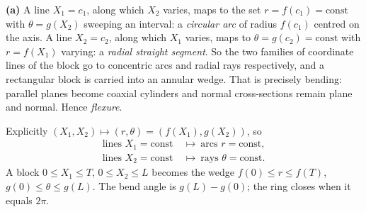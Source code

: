 \begin{solution}
\textbf{(a)} A line $X_{1}=c_{1}$, along which $X_{2}$ varies, maps to the
set $r=f(c_{1})=\text{const}$ with $\theta=g(X_{2})$ sweeping an interval:
a \emph{circular arc} of radius $f(c_{1})$ centred on the axis. A line
$X_{2}=c_{2}$, along which $X_{1}$ varies, maps to $\theta=g(c_{2})
=\text{const}$ with $r=f(X_{1})$ varying: a \emph{radial straight
segment}. So the two families of coordinate lines of the block go to
concentric arcs and radial rays respectively, and a rectangular block is
carried into an annular wedge. That is precisely bending: parallel planes
become coaxial cylinders and normal cross-sections remain plane and
normal. Hence \emph{flexure}.

Explicitly $(X_{1},X_{2})\mapsto(r,\theta)=(f(X_{1}),g(X_{2}))$, so
\[
\begin{aligned}
   \text{lines } X_{1}=\text{const}\ &\longmapsto\ \text{arcs }
     r=\text{const},\\
   \text{lines } X_{2}=\text{const}\ &\longmapsto\ \text{rays }
     \theta=\text{const}.
\end{aligned}
\]
A block $0\le X_{1}\le T$, $0\le X_{2}\le L$ becomes the wedge
$f(0)\le r\le f(T)$, $g(0)\le\theta\le g(L)$. The bend angle is
$g(L)-g(0)$; the ring closes when it equals $2\pi$.


\end{solution}
